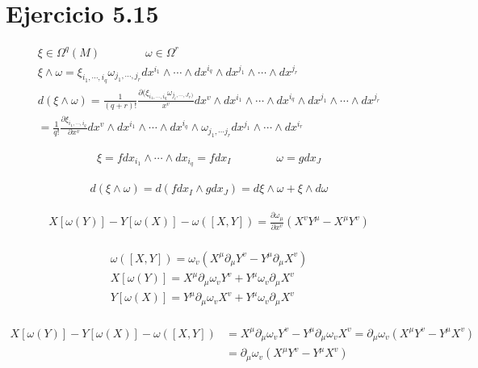 \documentclass{article}
\begin{document}
\section{Ejercicio 5.15}
\begin{gather*}
  \xi \in \Omega ^ {q }(M) \qquad \qquad \omega\in \Omega ^ {r }\\
  \xi \land \omega = \xi _{i_1, \cdots, i_q }\omega _{j_1, \cdots, j_r } dx ^ {i_1 } \land \cdots \land dx ^ {i_q }\land dx ^ {j_1}\land \cdots \land dx ^ {j_r }\\
  d(\xi \land \omega) = \frac{1}{(q+r)!} \frac{\partial (\xi _{i_1, \cdots, i_q } \omega _{j_i,\cdots,J_r )} }{x ^ {v }} dx ^ {v }\land dx ^ {i _1}\land \cdots \land dx ^ {i_q }\land dx ^ {j_1 }\land \cdots \land dx ^ {j_r }\\
  = \frac{1}{q! } \frac{\partial \xi _{i_1, \cdots, i_q }  }{\partial x ^ {v }}dx ^ {v } \land dx ^ {i_1 }\land \cdots \land dx ^ {i_q }\land \omega_{j_1 , \cdots j_r  } dx ^ {j_1 }\land \cdots \land dx ^ {i_r }
\end{gather*}

\begin{gather*}
  \xi = f dx_{i_1}\land \cdots \land dx _{i_q } = f dx _{I }  \qquad \qquad \omega = g dx _{J } 
\end{gather*}

\begin{gather*}
  d(\xi \land \omega ) = d(f dx_I \land g dx_J ) = d\xi \land \omega + \xi \land d\omega 
\end{gather*}

\begin{gather*}
  X[\omega(Y)] - Y[\omega(X)] - \omega([X,Y]) = \frac{\partial \omega_\mu  }{\partial x^v } (X^vY^\mu- X^\mu Y^v )\\
\end{gather*}

\begin{gather*}
  \omega([X,Y]) = \omega_v(X^\mu \partial_\mu Y^v - Y^\mu \partial_\mu X^v )\\
  X[\omega(Y)] = X^\mu \partial_\mu \omega_v Y^v + Y^\mu \omega_v \partial_\mu X^v\\
  Y[\omega(X)] = Y^\mu \partial_\mu \omega_v X^v + Y^\mu \omega_v \partial_\mu X^v\\
\end{gather*}

\begin{align*}
  X[\omega(Y)] - Y[\omega(X)] - \omega([X,Y]) &= X^\mu \partial_\mu \omega_v Y^v - Y^\mu \partial_\mu \omega_v X^v = \partial_\mu \omega_v (X^\mu Y^v - Y^\mu X^v )\\
  &= \partial_\mu \omega_v (X^\mu Y^v - Y^\mu X^v )
\end{align*}
\end{document}
